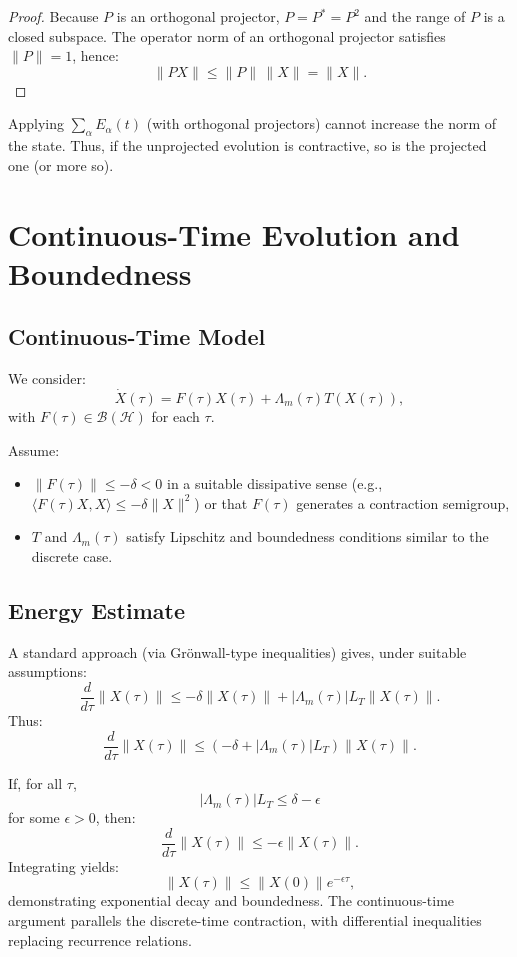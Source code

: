 \documentclass[11pt]{article}
\begin{document}
\begin{proof}
Because \(P\) is an orthogonal projector, \(P = P^* = P^2\) and the range of \(P\) is a closed subspace. The operator norm of an orthogonal projector satisfies \(\|P\| = 1\), hence:
\[
  \|P X\| \leq \|P\| \, \|X\| = \|X\|.
\]
\end{proof}

\begin{corollary}
Applying \(\sum_\alpha E_\alpha(t)\) (with orthogonal projectors) cannot increase the norm of the state. Thus, if the unprojected evolution is contractive, so is the projected one (or more so).
\end{corollary}

\section{Continuous-Time Evolution and Boundedness}

\subsection{Continuous-Time Model}

We consider:
\[
  \dot{X}(\tau) = F(\tau) X(\tau) + \Lambda_m(\tau) T(X(\tau)),
\]
with \(F(\tau) \in \mathcal{B}(\mathcal{H})\) for each \(\tau\).

Assume:
\begin{itemize}
  \item \(\|F(\tau)\| \leq -\delta < 0\) in a suitable dissipative sense (e.g., \(\langle F(\tau) X, X \rangle \leq -\delta \|X\|^2\)) or that \(F(\tau)\) generates a contraction semigroup,
  \item \(T\) and \(\Lambda_m(\tau)\) satisfy Lipschitz and boundedness conditions similar to the discrete case.
\end{itemize}

\subsection{Energy Estimate}

A standard approach (via Grönwall-type inequalities) gives, under suitable assumptions:
\[
  \frac{d}{d\tau} \|X(\tau)\|
  \leq -\delta \|X(\tau)\| + |\Lambda_m(\tau)| L_T \|X(\tau)\|.
\]
Thus:
\[
  \frac{d}{d\tau} \|X(\tau)\|
  \leq(-\delta + |\Lambda_m(\tau)| L_T)\|X(\tau)\|.
\]

If, for all \(\tau\),
\[
  |\Lambda_m(\tau)| L_T \leq \delta - \epsilon
\]
for some \(\epsilon > 0\), then:
\[
  \frac{d}{d\tau} \|X(\tau)\| \leq -\epsilon \|X(\tau)\|.
\]
Integrating yields:
\[
  \|X(\tau)\| \leq \|X(0)\| e^{-\epsilon \tau},
\]
demonstrating exponential decay and boundedness. The continuous-time argument parallels the discrete-time contraction, with differential inequalities replacing recurrence relations.
\end{document}
